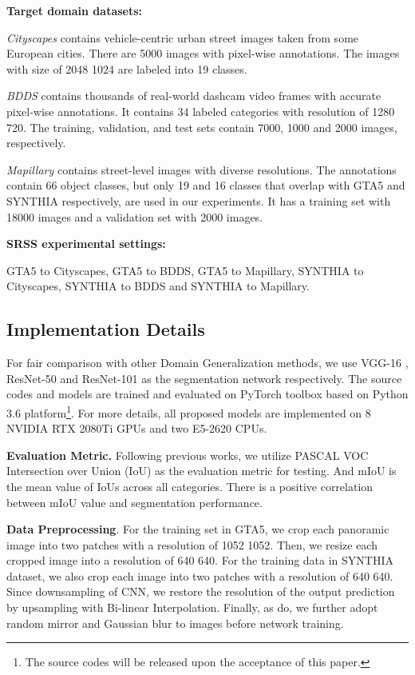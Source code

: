 \documentclass[twocolumn,journal,vlined,ruled,linesnumbered]{IEEEtran}
\begin{document}
\noindent \textbf{Target domain datasets:}

\textit{Cityscapes} contains vehicle-centric urban street images taken from some European cities. There are 5000 images with pixel-wise annotations. The images with size of 2048  1024 are labeled into 19 classes.

\textit{BDDS} contains thousands of real-world dashcam video frames with accurate pixel-wise annotations. It contains 34 labeled categories with resolution of 1280  720. The training, validation, and test sets contain 7000, 1000 and 2000 images, respectively.

\textit{Mapillary} contains street-level images with diverse resolutions. The annotations contain 66 object classes, but only 19 and 16 classes that overlap with GTA5 and SYNTHIA respectively, are used in our experiments. It has a training set with 18000 images and a validation set with 2000 images.

\noindent \textbf{SRSS experimental settings:}

 GTA5 to Cityscapes,  GTA5 to BDDS,  GTA5 to Mapillary,  SYNTHIA to Cityscapes,  SYNTHIA to BDDS and  SYNTHIA to Mapillary.

\subsection{Implementation Details\label{subsec:Implementation-Details}}

For fair comparison with other Domain Generalization methods, we use VGG-16 \cite{simonyan2014very}, ResNet-50 and ResNet-101 \cite{he2016deep} as the segmentation network respectively. The source codes and models are trained and evaluated on PyTorch toolbox \cite{paszke2019pytorch} based on Python 3.6 platform\footnote{The source codes will be released upon the acceptance of this paper.}. For more details, all proposed models are implemented on 8 NVIDIA RTX 2080Ti GPUs and two E5-2620 CPUs.

\textbf{Evaluation Metric.} Following previous works, we utilize PASCAL VOC Intersection over Union (IoU) \cite{everingham2015pascal} as the evaluation metric for testing. And mIoU is the mean value of IoUs across all categories. There is a positive correlation between mIoU value and segmentation performance.

\textbf{Data Preprocessing}. For the training set in GTA5, we crop each panoramic image into two patches with a resolution of 1052  1052. Then, we resize each cropped image into a resolution of 640  640. For the training data in SYNTHIA dataset, we also crop each image into two patches with a resolution of 640  640. Since downsampling of CNN, we restore the resolution of the output prediction by upsampling with Bi-linear Interpolation. Finally, as \cite{zhao2017pyramid,chen2019domain} do, we further adopt random mirror and Gaussian blur to images before network training.
\end{document}
